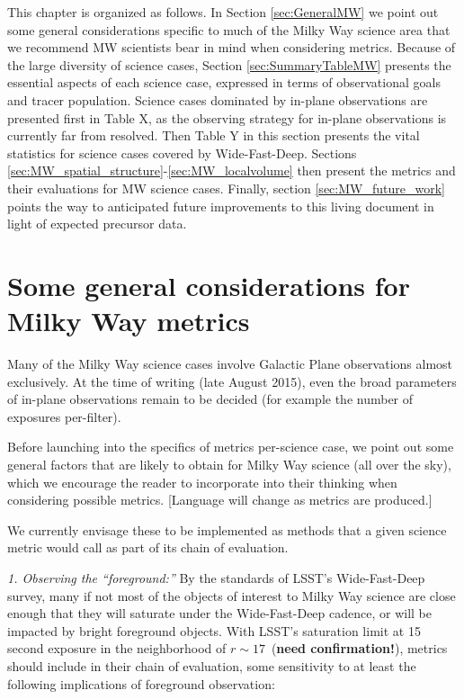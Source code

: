 This chapter is organized as follows. In Section \ref{sec:GeneralMW}
we point out some general considerations specific to much of the Milky
Way science area that we recommend MW scientists bear in mind when
considering metrics. Because of the large diversity of science cases,
Section \ref{sec:SummaryTableMW} presents the essential aspects of
each science case, expressed in terms of observational goals and
tracer population. Science cases dominated by in-plane observations
are presented first in Table X, as the observing strategy for in-plane
observations is currently far from resolved. Then Table Y in this
section presents the vital statistics for science cases covered by
Wide-Fast-Deep. Sections
\ref{sec:MW_spatial_structure}-\ref{sec:MW_localvolume} then present
the metrics and their evaluations for MW science cases. Finally,
section \ref{sec:MW_future_work} points the way to anticipated future
improvements to this living document in light of expected precursor data.

\section{Some general considerations for Milky Way metrics}
\def\secname{GeneralMW}\label{sec:\secname}

Many of the Milky Way science cases involve Galactic Plane
observations almost exclusively. At the time of writing (late August
2015), even the broad parameters of in-plane observations remain to be
decided (for example the number of exposures per-filter).

Before launching into the specifics of metrics per-science case, we
point out some general factors that are likely to obtain for Milky Way
science (all over the sky), which we encourage the reader to
incorporate into their thinking when considering possible
metrics. [Language will change as metrics are produced.]

We currently envisage these to be implemented as methods that a given
science metric would call as part of its chain of evaluation.

{\it 1. Observing the ``foreground:''} By the standards of LSST's
Wide-Fast-Deep survey, many if not most of the objects of interest to
Milky Way science are close enough that they will saturate under the
Wide-Fast-Deep cadence, or will be impacted by bright foreground
objects. With LSST's saturation limit at 15 second exposure in the
neighborhood of $r \sim 17$~({\bf need confirmation!}), metrics should
include in their chain of evaluation, some sensitivity to at least the
following implications of foreground observation:


